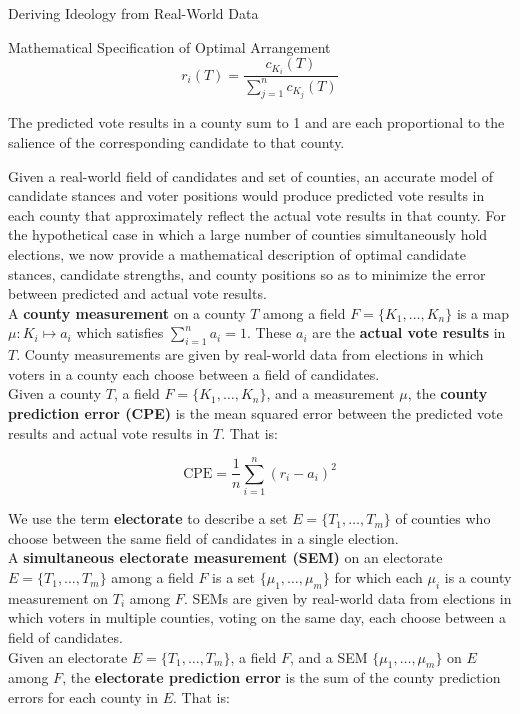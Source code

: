 \documentclass{article}
\newcommand{\noi}{\noindent}
\begin{document}
\begin{section}{Deriving Ideology from Real-World Data}
\begin{subsection}{Mathematical Specification of Optimal Arrangement}
$$r_i(T) = \frac{c_{K_i}(T)}{ \sum_{j=1}^n c_{K_j}(T)}$$

\noi The predicted vote results in a county sum to 1 and are each proportional to the salience of the corresponding candidate to that county.

Given a real-world field of candidates and set of counties, an accurate model of candidate stances and voter positions would produce predicted vote results in each county that approximately reflect the actual vote results in that county. For the hypothetical case in which a large number of counties simultaneously hold elections, we now provide a mathematical description of optimal candidate stances, candidate strengths, and county positions so as to minimize the error between predicted and actual vote results. \\

\noi A \textbf{county measurement} on a county $T$ among a field $F = \{K_1, \ldots, K_n\}$ is a map $\mu : K_i \mapsto a_i$ which satisfies $\sum_{i=1}^n a_i = 1$. These $a_i$ are the \textbf{actual vote results} in $T$. County measurements are given by real-world data from elections in which voters in a county each choose between a field of candidates. \\

\noi Given a county $T$, a field $F = \{K_1, \ldots, K_n\}$, and a measurement $\mu$, the \textbf{county prediction error (CPE)} is the mean squared error between the predicted vote results and actual vote results in $T$. That is:

$$\text{CPE} = \frac{1}{n} \sum_{i=1}^n (r_i - a_i)^2$$

\noi We use the term \textbf{electorate} to describe a set $E = \{T_1, \ldots, T_m\}$ of counties who choose between the same field of candidates in a single election. \\

\noi A \textbf{simultaneous electorate measurement (SEM)} on an electorate $E = \{T_1, \ldots, T_m\}$ among a field $F$ is a set $\{\mu_1, \ldots, \mu_m\}$ for which each $\mu_i$ is a county measurement on $T_i$ among $F$. SEMs are given by real-world data from elections in which voters in multiple counties, voting on the same day, each choose between a field of candidates. \\

\noi Given an electorate $E = \{T_1, \ldots, T_m\}$, a field $F$, and a SEM $\{\mu_1, \ldots, \mu_m\}$ on $E$ among $F$, the \textbf{electorate prediction error} is the sum of the county prediction errors for each county in $E$. That is:


\end{subsection}
\end{section}
\end{document}
